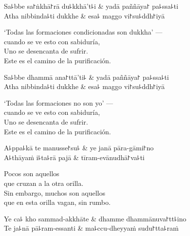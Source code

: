 \begin{twochants}
  Sa꜕bbe sa꜓ṅkhā꜓rā du꜕kkhā't꜕i & yadā paññāya꜓ pa꜕ssa꜕ti \\
  Atha nibbinda꜕ti dukkhe & esa꜕ maggo vi꜓su꜕ddh꜓iyā \\
\end{twochants}

\begin{english}
  `Todas las formaciones condicionadas son dukkha' ---\\
  cuando se ve esto con sabiduría,\\
  Uno se desencanta de sufrir.\\
  Este es el camino de la purificación.
\end{english}

\begin{twochants}
  Sa꜕bbe dhammā ana꜓ttā'ti꜕ & yadā paññāya꜓ pa꜕ssa꜕ti \\
  Atha nibbinda꜕ti dukkhe & esa꜕ maggo vi꜓su꜕ddh꜓iyā \\
\end{twochants}

\begin{english}
  `Todas las formaciones no son yo' ---\\
  cuando se ve esto con sabiduría,\\
  Uno se desencanta de sufrir.\\
  Este es el camino de la purificación.
\end{english}

\clearpage

\begin{twochants}
  A꜕ppa꜕kā te manusse꜓su꜕ & ye janā pāra-gāmi꜓no \\
  A꜕thāyaṁ i꜕ta꜕rā pajā & tīram-evānudhā꜓va꜕ti \\
\end{twochants}

\begin{english}
  Pocos son aquellos\\
  que cruzan a la otra orilla.\\
  Sin embargo, muchos son aquellos\\
  que en esta orilla vagan, sin rumbo.
\end{english}

\begin{twochants}
  Ye ca꜕ kho sammad-akkhāte & dhamme dhammānuva꜓tt꜕ino \\
  Te ja꜕nā pā꜕ram-essanti & ma꜕ccu-dheyyaṁ sudu꜓tta꜕raṁ \\
\end{twochants}

